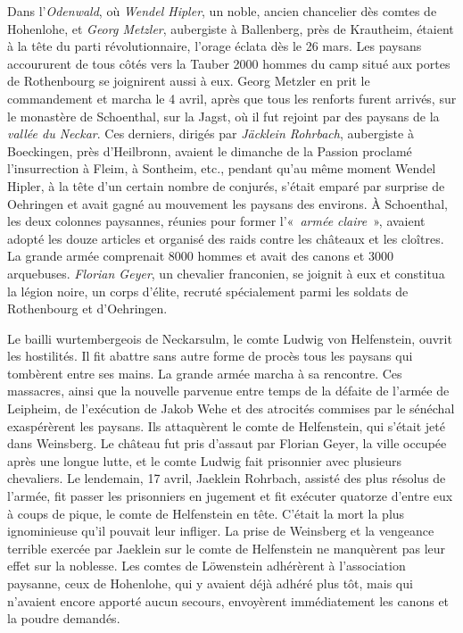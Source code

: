 \documentclass[french,twoside]{book} %
\begin{document}
Dans l’\emph{Odenwald}, où \emph{Wendel Hipler}, un noble, ancien chancelier dès comtes de Hohenlohe, et \emph{Georg Metzler}, aubergiste à Ballenberg, près de Krautheim, étaient à la tête du parti révolutionnaire, l’orage éclata dès le 26 mars. Les paysans accoururent de tous côtés vers la Tauber 2000 hommes du camp situé aux portes de Rothenbourg se joignirent aussi à eux. Georg Metzler en prit le commandement et marcha le 4 avril, après que tous les renforts furent arrivés, sur le monastère de Schoenthal, sur la Jagst, où il fut rejoint par des paysans de la \emph{vallée du Neckar}. Ces derniers, dirigés par \emph{Jäcklein Rohrbach}, aubergiste à Boeckingen, près d’Heilbronn, avaient le dimanche de la Passion proclamé l’insurrection à Fleim, à Sontheim, etc., pendant qu’au même moment Wendel Hipler, à la tête d’un certain nombre de conjurés, s’était emparé par surprise de Oehringen et avait gagné au mouvement les paysans des environs. À Schoenthal, les deux colonnes paysannes, réunies pour former l’« \emph{armée claire} », avaient adopté les douze articles et organisé des raids contre les châteaux et les cloîtres. La grande armée comprenait 8000 hommes et avait des canons et 3000 arquebuses. \emph{Florian Geyer}, un chevalier franconien, se joignit à eux et constitua la légion noire, un corps d’élite, recruté spécialement parmi les soldats de Rothenbourg et d’Oehringen.\par
Le bailli wurtembergeois de Neckarsulm, le comte Ludwig von Helfenstein, ouvrit les hostilités. Il fit abattre sans autre forme de procès tous les paysans qui tombèrent entre ses mains. La grande armée marcha à sa rencontre. Ces massacres, ainsi que la nouvelle parvenue entre temps de la défaite de l’armée de Leipheim, de l’exécution de Jakob Wehe et des atrocités commises par le sénéchal exaspérèrent les paysans. Ils attaquèrent le comte de Helfenstein, qui s’était jeté dans Weinsberg. Le château fut pris d’assaut par Florian Geyer, la ville occupée après une longue lutte, et le comte Ludwig fait prisonnier avec plusieurs chevaliers. Le lendemain, 17 avril, Jaeklein Rohrbach, assisté des plus résolus de l’armée, fit passer les prisonniers en jugement et fit exécuter quatorze d’entre eux à coups de pique, le comte de Helfenstein en tête. C’était la mort la plus ignominieuse qu’il pouvait leur infliger. La prise de Weinsberg et la vengeance terrible exercée par Jaeklein sur le comte de Helfenstein ne manquèrent pas leur effet sur la noblesse. Les comtes de Löwenstein adhérèrent à l’association paysanne, ceux de Hohenlohe, qui y avaient déjà adhéré plus tôt, mais qui n’avaient encore apporté aucun secours, envoyèrent immédiatement les canons et la poudre demandés.\par
\end{document}
